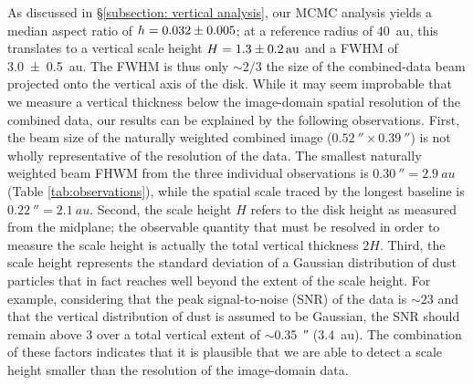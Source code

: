 \documentclass[modern]{aastex62}
\begin{document}
As discussed in \S \ref{subsection: vertical analysis}, our MCMC analysis yields a median aspect ratio of $h=\num{0.032 \pm 0.005}$; at a reference radius of \SI{40}{au}, this translates to a vertical scale height $H = \SI{1.3 \pm 0.2}{au}$ and a FWHM of \SI{3.0 \pm 0.5}{au}.
The FWHM is thus only $\sim 2/3$ the size of the combined-data beam projected onto the vertical axis of the disk.
While it may seem improbable that we measure a vertical thickness below the image-domain spatial resolution of the combined data, our results can be explained by the following observations.
First, the beam size of the naturally weighted combined image ($\SI{0.52}{\arcsecond} \times \SI{0.39}{\arcsecond}$) is not wholly representative of the resolution of the data. 
The smallest naturally weighted beam FHWM from the three individual observations is $\SI{0.30}{\arcsecond} = \SI{2.9}{au}$ (Table \ref{tab:observations}), while the spatial scale traced by the longest baseline is $\SI{0.22}{\arcsecond} = \SI{2.1}{au}$.
Second, the scale height $H$ refers to the disk height as measured from the midplane; the observable quantity that must be resolved in order to measure the scale height is actually the total vertical thickness $2H$.
Third, the scale height represents the standard deviation of a Gaussian distribution of dust particles that in fact reaches well beyond the extent of the scale height.
For example, considering that the peak signal-to-noise (SNR) of the data is $\sim 23$ and that the vertical distribution of dust is assumed to be Gaussian, the SNR should remain above 3 over a total vertical extent of $\sim$\SI{0.35}{\arcsecond} (\SI{3.4}{au}). 
The combination of these factors indicates that it is plausible that we are able to detect a scale height smaller than the resolution of the image-domain data.
\end{document}
